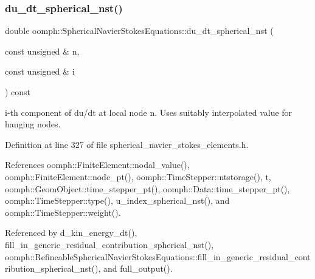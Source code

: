 \mbox{\label{classoomph_1_1SphericalNavierStokesEquations_a6f9ce7398b2f2a767fddc7473046c674}} 
\subsubsection{\texorpdfstring{du\+\_\+dt\+\_\+spherical\+\_\+nst()}{du\_dt\_spherical\_nst()}}
{\footnotesize\ttfamily double oomph\+::\+Spherical\+Navier\+Stokes\+Equations\+::du\+\_\+dt\+\_\+spherical\+\_\+nst (\begin{DoxyParamCaption}\item[{const unsigned \&}]{n,  }\item[{const unsigned \&}]{i }\end{DoxyParamCaption}) const\hspace{0.3cm}{\ttfamily [inline]}}



i-\/th component of du/dt at local node n. Uses suitably interpolated value for hanging nodes. 



Definition at line 327 of file spherical\+\_\+navier\+\_\+stokes\+\_\+elements.\+h.



References oomph\+::\+Finite\+Element\+::nodal\+\_\+value(), oomph\+::\+Finite\+Element\+::node\+\_\+pt(), oomph\+::\+Time\+Stepper\+::ntstorage(), t, oomph\+::\+Geom\+Object\+::time\+\_\+stepper\+\_\+pt(), oomph\+::\+Data\+::time\+\_\+stepper\+\_\+pt(), oomph\+::\+Time\+Stepper\+::type(), u\+\_\+index\+\_\+spherical\+\_\+nst(), and oomph\+::\+Time\+Stepper\+::weight().



Referenced by d\+\_\+kin\+\_\+energy\+\_\+dt(), fill\+\_\+in\+\_\+generic\+\_\+residual\+\_\+contribution\+\_\+spherical\+\_\+nst(), oomph\+::\+Refineable\+Spherical\+Navier\+Stokes\+Equations\+::fill\+\_\+in\+\_\+generic\+\_\+residual\+\_\+contribution\+\_\+spherical\+\_\+nst(), and full\+\_\+output().

\mbox{\label{classoomph_1_1SphericalNavierStokesEquations_af0dcacf87c6c58d640a280603a992bd6}} 
